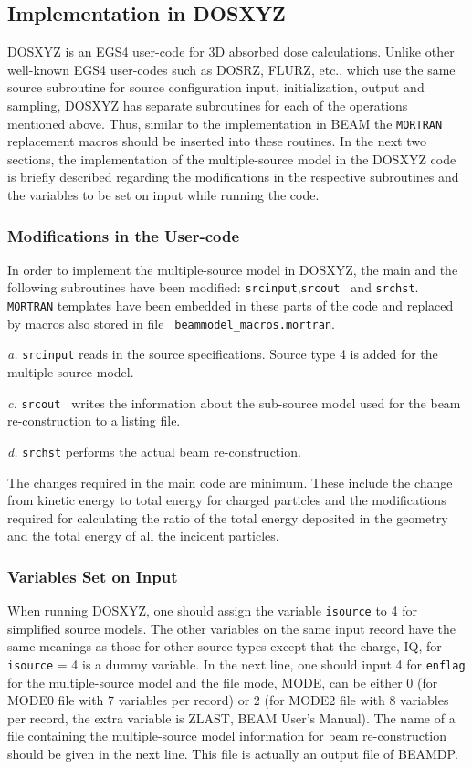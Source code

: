 \documentclass[12pt,twoside]{article}
\begin{document}
\subsection{Implementation in DOSXYZ}

DOSXYZ is an EGS4 user-code for 3D absorbed dose calculations. Unlike
other well-known EGS4 user-codes such as DOSRZ, FLURZ, etc., which use the
same source subroutine for source configuration input, initialization,
output and sampling, DOSXYZ has separate subroutines for each of the
operations mentioned above.  Thus, similar to the implementation in BEAM
the {\tt MORTRAN} replacement macros should be inserted into these
routines. In the next two sections, the implementation of the
multiple-source model in the DOSXYZ code is briefly described regarding
the modifications in the respective subroutines and the variables to be
set on input while running the code.

\subsubsection{Modifications in the User-code}

In order to implement the multiple-source model in DOSXYZ, the main and
the following subroutines have been modified: {\tt srcinput},{\tt srcout }
and {\tt srchst}. {\tt MORTRAN} templates have been embedded in these parts of
the code and replaced by macros also stored in file {\tt
beammodel\_macros.mortran}.

{\noindent\it a.} {\tt srcinput} reads in the source specifications. Source type 4 is added for the multiple-source model.

{\noindent\it c.} {\tt srcout } writes the information about the sub-source model used for the beam re-construction to a listing file.

{\noindent\it d.} {\tt srchst} performs the actual beam re-construction.

The changes required in the main code are minimum. These include the change from kinetic energy to total energy for charged particles and the modifications required for calculating the ratio of the total energy deposited in the geometry and the total energy of all the incident particles.

\subsubsection{Variables Set on Input}

When running DOSXYZ, one should assign the variable {\tt isource} to 4 for
simplified source models. The other variables on the same input record
have the same meanings as those for other source types except that the
charge, IQ, for {\tt isource} = 4 is a dummy variable. In the next line,
one should input 4 for {\tt enflag} for the multiple-source model and the
file mode, MODE, can be either 0 (for MODE0 file with 7 variables per
record) or 2 (for MODE2 file with 8 variables per record, the extra
variable is ZLAST, BEAM User's Manual). The name of a file containing the
multiple-source model information for beam re-construction should be given
in the next line. This file is actually an output file of BEAMDP.
\end{document}
